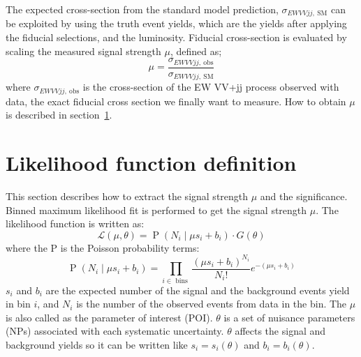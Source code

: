 The expected cross-section from the standard model prediction, $\sigma_{EW VVjj \mathrm{, \ SM}}$ can be exploited by using the truth event yields, which are the yields after applying the fiducial selections, and the luminosity.
Fiducial cross-section is evaluated by scaling the measured signal strength $\mu$, defined as;
\begin{equation}
\mu = \frac{\sigma_{EW VVjj \mathrm{, \ obs}}}{\sigma_{EW VVjj \mathrm{, \ SM}}}
\end{equation}
where $\sigma_{EW VVjj \mathrm{, \ obs}}$ is the cross-section of the EW VV+jj process observed with data, the exact fiducial cross section we finally want to measure.
How to obtain $\mu$ is described in section~\ref{sec:likelihood}.

\section{Likelihood function definition}
\label{sec:likelihood}
This section describes how to extract the signal strength $\mu$ and the significance.
Binned maximum likelihood fit is performed to get the signal strength $\mu$. 
The likelihood function is written as:
\begin{equation}
\label{eq:poisson}
\mathcal{L}(\mu, \theta) = \operatorname{P}\left(N_{i} \mid \mu s_{i}+b_{i}\right) \cdot G(\theta) 
\end{equation}
where the P is the Poisson probability terms:
\begin{equation}
\operatorname{P}\left(N_{i} \mid \mu s_{i}+b_{i}\right) = \prod_{i \in \text { bins }} \frac{\left(\mu s_{i}+b_{i}\right)^{N_{i}}}{N_{i} !} e^{-\left(\mu s_{i}+b_{i}\right)} 
\end{equation}
$s_i$ and $b_i$ are the expected number of the signal and the background events yield in bin $i$, and $N_i$ is the number of the observed events from data in the bin. 
The $\mu$ is also called as the parameter of interest (POI). $\theta$ is a set of nuisance parameters (NPs) associated with each systematic uncertainty. $\theta$ affects the signal and background yields so it can be written like $s_{i}=s_{i}(\theta)$ and $b_{i}=b_{i}(\theta)$. 
